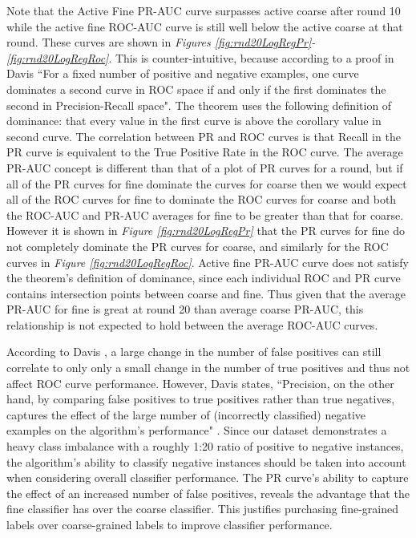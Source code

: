 \documentclass[ms]{nuthesis}
\begin{document}
\par Note that the Active Fine PR-AUC curve
surpasses active coarse after round 10 while the active fine ROC-AUC curve is still well below the
 active coarse at that round. These curves are shown in \textit{Figures \ref{fig:rnd20LogRegPr}-
 \ref{fig:rnd20LogRegRoc}}. This is counter-intuitive, because according to a proof in Davis \cite{DavisRocPr}
 ``For a fixed number of positive and negative examples, one curve dominates a second curve in
 ROC space if and only if the first dominates the second in Precision-Recall space". The theorem uses the
 following definition of dominance: that every value in the first curve is above the corollary value in
 second curve. The correlation between PR and ROC curves is that Recall in the PR curve is equivalent to
 the True Positive Rate in the ROC curve. The average PR-AUC concept is different than that of a plot of
 PR curves for a round, but if all of the PR curves for fine dominate the curves for coarse then we would
  expect all of the ROC curves for fine to dominate the ROC curves for coarse and both the ROC-AUC and PR-AUC
   averages for fine to be greater than that for coarse. However it is shown in \textit{Figure \ref{fig:rnd20LogRegPr}}
   that the PR curves for fine do not completely dominate the PR curves for coarse, and similarly for the ROC curves
   in \textit{Figure \ref{fig:rnd20LogRegRoc}}. Active fine PR-AUC curve does not satisfy the theorem's
   definition of dominance, since each individual ROC and PR curve contains intersection points between
   coarse and fine. Thus given that the average PR-AUC for fine is great at round 20 than average coarse PR-AUC,
   this relationship is not expected to hold between the average ROC-AUC curves.
   \par According to Davis \cite{DavisRocPr}, a large change in the number of false
   positives can still correlate to only only a small change in the
   number of true positives and thus not affect ROC curve performance. However,
   Davis states, ``Precision, on the other hand, by comparing false
   positives to true positives rather than true
   negatives, captures the effect of the large number
    of (incorrectly classified) negative examples on the
   algorithm's performance" \cite{DavisRocPr}. Since our dataset demonstrates a heavy class imbalance with
    a roughly 1:20 ratio of positive to negative instances, the algorithm's ability
    to classify negative instances
    should be taken into account when considering overall classifier performance.
    The PR curve's ability to capture
    the effect of an increased number of false positives, reveals the advantage that the fine
    classifier has over the coarse classifier. This justifies purchasing
    fine-grained labels over coarse-grained labels
    to improve classifier performance.
\end{document}
